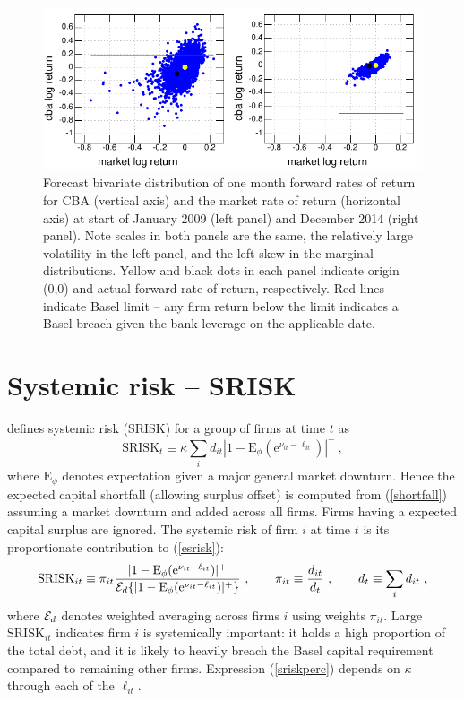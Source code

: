 \documentclass[authoryear]{elsarticle}
\newcommand{\E}{\mathrm{E}}
\newcommand{\e}{\mathrm{e}}
\newcommand{\Ex}{{\cal E}}
\newcommand{\Es}{\E_\phi}
\newcommand{\eref}[1]{(\ref{#1})}
\newcommand{\cq}{\ , \qquad}
\newcommand{\be}[1]{\begin{equation}\label{#1}}
\newcommand{\ee}{\end{equation}}
\begin{document}
\begin{figure}[htbp]
\begin{center}
\includegraphics{figures/simulation.pdf}
\caption{Forecast bivariate distribution of one month forward rates of return   for CBA (vertical axis) and the market rate of return (horizontal axis) at start of January 2009 (left panel)  and December 2014 (right panel). Note scales in both panels are the same, the relatively large volatility in the left panel, and the left skew in the  marginal distributions.  Yellow and black dots in each panel indicate origin (0,0) and  actual forward  rate of return, respectively.   Red lines indicate Basel limit -- any firm return below the limit indicates a Basel breach given the bank leverage on the applicable date.}
\label{simulation}
\end{center}
\end{figure}




\section{Systemic risk -- SRISK}\label{srisk}

 \cite{brownlees2015} defines  systemic risk (SRISK) for a group of firms  at time $t$ as
\be{esrisk}
\mathrm{SRISK}_t\equiv\kappa\sum_i d_{it}\left|1-\Es(\e^{\nu_{it}-\ell_{it}})\right|^+ \ ,
\ee
where  $\Es$ denotes expectation given a major general market downturn. Hence the expected capital shortfall (allowing surplus offset) is computed from \eref{shortfall} assuming a market downturn and added across all firms. Firms having a expected capital surplus are ignored. The systemic risk of firm $i$ at time $t$ is its proportionate contribution to \eref{esrisk}:
 \be{sriskperc}
 \mathrm{SRISK}_{it}\equiv \pi_{it}\frac{|1-\Es(\e^{\nu_{it}-\ell_{it}})|^+}{\Ex_d\{|1-\Es(\e^{\nu_{it}-\ell_{it}})|^+\}}\cq \pi_{it}\equiv \frac{d_{it}}{d_t}\cq d_t\equiv \sum_i d_{it}\ ,
 \ee
where $\Ex_d$ denotes weighted averaging across firms $i$ using weights $\pi_{it}$.     Large $\mathrm{SRISK}_{it}$ indicates firm $i$ is systemically important: it holds a high proportion of the total debt, and it is likely to heavily breach the Basel capital requirement compared to remaining other firms.  Expression \eref{sriskperc} depends on $\kappa$ through each of the $\ell_{it}$.
\end{document}
